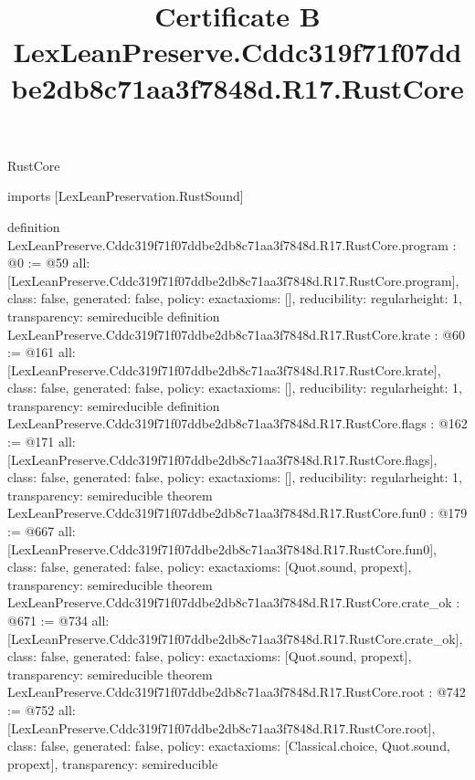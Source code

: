 \begin{lexlean}{RustCore}
\title{Certificate B LexLeanPreserve.Cddc319f71f07ddbe2db8c71aa3f7848d.R17.RustCore}
\begin{coremodule}
imports [LexLeanPreservation.RustSound]

definition LexLeanPreserve.Cddc319f71f07ddbe2db8c71aa3f7848d.R17.RustCore.program : @0 := @59 {
  all: [LexLeanPreserve.Cddc319f71f07ddbe2db8c71aa3f7848d.R17.RustCore.program],
  class: false,
  generated: false,
  policy: exact{axioms: []},
  reducibility: regular{height: 1},
  transparency: semireducible
}
definition LexLeanPreserve.Cddc319f71f07ddbe2db8c71aa3f7848d.R17.RustCore.krate : @60 := @161 {
  all: [LexLeanPreserve.Cddc319f71f07ddbe2db8c71aa3f7848d.R17.RustCore.krate],
  class: false,
  generated: false,
  policy: exact{axioms: []},
  reducibility: regular{height: 1},
  transparency: semireducible
}
definition LexLeanPreserve.Cddc319f71f07ddbe2db8c71aa3f7848d.R17.RustCore.flags : @162 := @171 {
  all: [LexLeanPreserve.Cddc319f71f07ddbe2db8c71aa3f7848d.R17.RustCore.flags],
  class: false,
  generated: false,
  policy: exact{axioms: []},
  reducibility: regular{height: 1},
  transparency: semireducible
}
theorem LexLeanPreserve.Cddc319f71f07ddbe2db8c71aa3f7848d.R17.RustCore.fun0 : @179 := @667 {
  all: [LexLeanPreserve.Cddc319f71f07ddbe2db8c71aa3f7848d.R17.RustCore.fun0],
  class: false,
  generated: false,
  policy: exact{axioms: [Quot.sound, propext]},
  transparency: semireducible
}
theorem LexLeanPreserve.Cddc319f71f07ddbe2db8c71aa3f7848d.R17.RustCore.crate_ok : @671 := @734 {
  all: [LexLeanPreserve.Cddc319f71f07ddbe2db8c71aa3f7848d.R17.RustCore.crate_ok],
  class: false,
  generated: false,
  policy: exact{axioms: [Quot.sound, propext]},
  transparency: semireducible
}
theorem LexLeanPreserve.Cddc319f71f07ddbe2db8c71aa3f7848d.R17.RustCore.root : @742 := @752 {
  all: [LexLeanPreserve.Cddc319f71f07ddbe2db8c71aa3f7848d.R17.RustCore.root],
  class: false,
  generated: false,
  policy: exact{axioms: [Classical.choice, Quot.sound, propext]},
  transparency: semireducible
}


\end{coremodule}
\end{lexlean}
